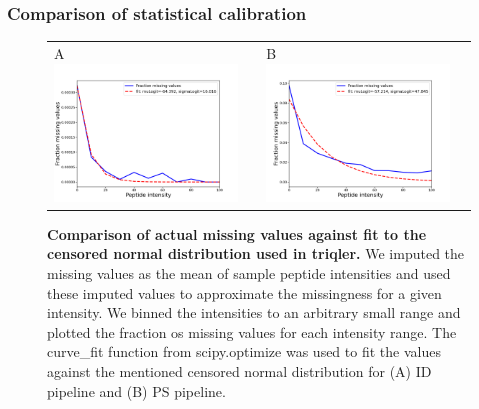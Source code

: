 \documentclass[11pt]{article}
\begin{document}
\subsubsection*{Comparison of statistical calibration}
\begin{figure}[hbt]
    \centering
    \centering
    \begin{tabular}{lclc} 
        A \includegraphics[width=0.5\linewidth]{../../result/report_plots_pipeline/fraction_missing_values_ID.png} & &%
        B \includegraphics[width=0.5\linewidth]{../../result/report_plots_pipeline/fraction_missing_values_PS.png} & \\%
    \end{tabular}
    \caption{{\bf Comparison of actual missing values against fit to the censored normal distribution used in triqler.} We imputed the missing values as the mean of sample peptide intensities and used these imputed values to approximate the missingness for a given intensity. We binned the intensities to an arbitrary small range and plotted the fraction os missing values for each intensity range. The curve\_fit function from scipy.optimize was used to fit the values against the mentioned censored normal distribution for (A) ID pipeline  and (B) PS pipeline. \label{fig:fraction_missing_values}}

\end{figure}
\end{document}
